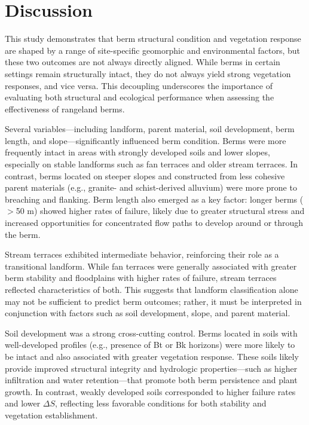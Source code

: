 \documentclass[review]{elsarticle}
\begin{document}
\section{Discussion}

This study demonstrates that berm structural condition and vegetation response are shaped by a range of site-specific geomorphic and environmental factors, but these two outcomes are not always directly aligned. While berms in certain settings remain structurally intact, they do not always yield strong vegetation responses, and vice versa. This decoupling underscores the importance of evaluating both structural and ecological performance when assessing the effectiveness of rangeland berms.

Several variables—including landform, parent material, soil development, berm length, and slope—significantly influenced berm condition. Berms were more frequently intact in areas with strongly developed soils and lower slopes, especially on stable landforms such as fan terraces and older stream terraces. In contrast, berms located on steeper slopes and constructed from less cohesive parent materials (e.g., granite- and schist-derived alluvium) were more prone to breaching and flanking. Berm length also emerged as a key factor: longer berms ($>$50 m) showed higher rates of failure, likely due to greater structural stress and increased opportunities for concentrated flow paths to develop around or through the berm.

Stream terraces exhibited intermediate behavior, reinforcing their role as a transitional landform. While fan terraces were generally associated with greater berm stability and floodplains with higher rates of failure, stream terraces reflected characteristics of both. This suggests that landform classification alone may not be sufficient to predict berm outcomes; rather, it must be interpreted in conjunction with factors such as soil development, slope, and parent material.

Soil development was a strong cross-cutting control. Berms located in soils with well-developed profiles (e.g., presence of Bt or Bk horizons) were more likely to be intact and also associated with greater vegetation response. These soils likely provide improved structural integrity and hydrologic properties—such as higher infiltration and water retention—that promote both berm persistence and plant growth. In contrast, weakly developed soils corresponded to higher failure rates and lower $\Delta S$, reflecting less favorable conditions for both stability and vegetation establishment.
\end{document}
